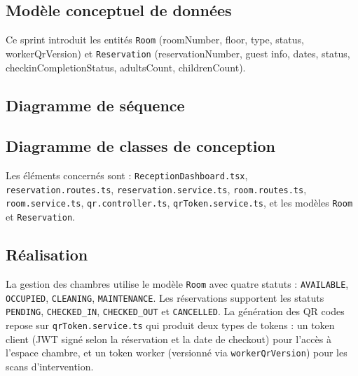 \subsection{Modèle conceptuel de données}
Ce sprint introduit les entités \texttt{Room} (roomNumber, floor, type, status, workerQrVersion) et \texttt{Reservation} (reservationNumber, guest info, dates, status, checkinCompletionStatus, adultsCount, childrenCount).


\subsection{Diagramme de séquence}

\subsection{Diagramme de classes de conception}
Les éléments concernés sont : \texttt{ReceptionDashboard.tsx}, \texttt{reservation.routes.ts}, \texttt{reservation.service.ts}, \texttt{room.routes.ts}, \texttt{room.service.ts}, \texttt{qr.controller.ts}, \texttt{qrToken.service.ts}, et les modèles \texttt{Room} et \texttt{Reservation}.


\subsection{Réalisation}
La gestion des chambres utilise le modèle \texttt{Room} avec quatre statuts : \texttt{AVAILABLE}, \texttt{OCCUPIED}, \texttt{CLEANING}, \texttt{MAINTENANCE}. Les réservations supportent les statuts \texttt{PENDING}, \texttt{CHECKED\_IN}, \texttt{CHECKED\_OUT} et \texttt{CANCELLED}. La génération des QR codes repose sur \texttt{qrToken.service.ts} qui produit deux types de tokens : un token client (JWT signé selon la réservation et la date de checkout) pour l'accès à l'espace chambre, et un token worker (versionné via \texttt{workerQrVersion}) pour les scans d'intervention.


